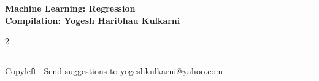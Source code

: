 \documentclass[8pt,landscape]{article}
\begin{document}
\footnotesize


\begin{center}
\Large{\textbf{Machine Learning: Regression\\ Compilation: Yogesh Haribhau Kulkarni}}
\end{center}

\begin{multicols}{2}

\end{multicols}

\rule{\linewidth}{0.25pt}
\scriptsize
Copyleft \textcopyleft\  Send suggestions to
\href{http://www.yogeshkulkarni.com}{yogeshkulkarni@yahoo.com}
\end{document}
